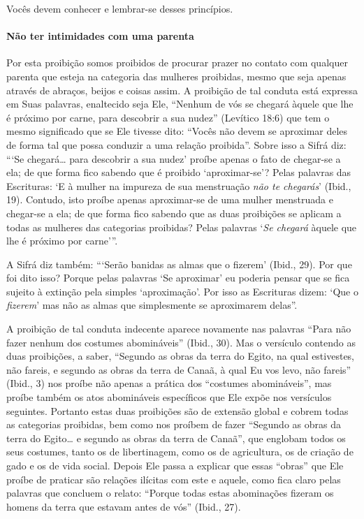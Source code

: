 Vocês devem conhecer e lembrar-se desses princípios.

\paragraph{Não ter intimidades com uma parenta}

Por esta proibição somos proibidos de procurar prazer no contato com
qualquer parenta que esteja na categoria das mulheres proibidas, mesmo
que seja apenas através de abraços, beijos e coisas assim. A proibição
de tal conduta está expressa em Suas palavras, enaltecido seja Ele,
``Nenhum de vós se chegará àquele que lhe é próximo por carne, para
descobrir a sua nudez'' (Levítico 18:6) que tem o mesmo significado que
se Ele tivesse dito: ``Vocês não devem se aproximar deles de forma tal
que possa conduzir a uma relação proibida''. Sobre isso a Sifrá diz:
```Se chegará\ldots{} para descobrir a sua nudez' proíbe apenas o fato de
chegar-se a ela; de que forma fico sabendo que é proibido
`aproximar-se'? Pelas palavras das Escrituras: `E à mulher na impureza
de sua menstruação \emph{não te chegarás}' (Ibid., 19). Contudo, isto
proíbe apenas aproximar-se de uma mulher menstruada e chegar-se a ela;
de que forma fico sabendo que as duas proibições se aplicam a todas as
mulheres das categorias proibidas? Pelas palavras `\emph{Se chegará}
àquele que lhe é próximo por carne'''.

A Sifrá diz também: ```Serão banidas as almas que o fizerem' (Ibid.,
29). Por que foi dito isso? Porque pelas palavras `Se aproximar' eu
poderia pensar que se fica sujeito à extinção pela simples
`aproximação'. Por isso as Escrituras dizem: `Que o \emph{fizerem}' mas
não as almas que simplesmente se aproximarem delas''.

A proibição de tal conduta indecente aparece novamente nas palavras
``Para não fazer nenhum dos costumes abomináveis'' (Ibid., 30). Mas o
versículo contendo as duas proibições, a saber, ``Segundo as obras da
terra do Egito, na qual estivestes, não fareis, e segundo as obras da
terra de Canaã, à qual Eu vos levo, não fareis'' (Ibid., 3) nos proíbe
não apenas a prática dos ``costumes abomináveis'', mas proíbe também os
atos abomináveis específicos que Ele expõe nos versículos seguintes.
Portanto estas duas proibições são de extensão global e cobrem todas as
categorias proibidas, bem como nos proíbem de fazer ``Segundo as obras
da terra do Egito\ldots{} e segundo as obras da terra de Canaã'', que
englobam todos os seus costumes, tanto os de libertinagem, como os de
agricultura, os de criação de gado e os de vida social. Depois Ele
passa a explicar que essas ``obras'' que Ele proíbe de praticar são
relações ilícitas com este e aquele, como fica claro pelas palavras que
concluem o relato: ``Porque todas estas abominações fizeram os homens da
terra que estavam antes de vós'' (Ibid., 27).


